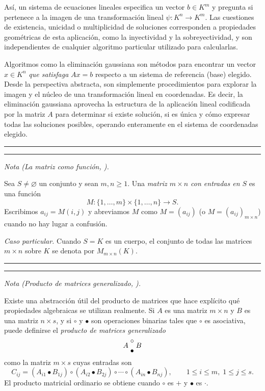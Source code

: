 Así, un sistema de ecuaciones lineales especifica un vector
\(
b \in K^m
\)
y pregunta si pertenece a la imagen de una transformación lineal
\(
\psi : K^n \to K^m.
\)
Las cuestiones de existencia, unicidad o multiplicidad de soluciones corresponden a propiedades geométricas de esta aplicación, como la inyectividad y la sobreyectividad, y son independientes de cualquier algoritmo particular utilizado para calcularlas.

\medskip

Algoritmos como la eliminación gaussiana son métodos para encontrar un vector
\(
x \in K^n
\)
\textit{que satisfaga}
\(
A x = b
\)
respecto a un sistema de referencia (base) elegido. Desde la perspectiva abstracta, son simplemente procedimientos para explorar la imagen y el núcleo de una transformación lineal en coordenadas. Es decir, la eliminación gaussiana aprovecha la estructura de la aplicación lineal codificada por la matriz \(A\) para determinar si existe solución, si es única y cómo expresar todas las soluciones posibles, operando enteramente en el sistema de coordenadas elegido.

\medskip
\hrule
\bigskip

\bigskip
\hrule
\medskip

\textit{Nota (La matriz como función, \cite{iribarren}).}

\medskip

Sea $S\neq\varnothing$ un conjunto y sean $m,n\ge 1$.
Una \emph{matriz $m\times n$ con entradas en $S$} es una función
\[
M:\{1,\dots,m\}\times\{1,\dots,n\}\longrightarrow S.
\]
Escribimos $a_{ij}=M(i,j)$ y abreviamos $M$ como $M=(a_{ij})$ (o $M=(a_{ij})_{m\times n}$) cuando no hay lugar a confusión.

\medskip

\textit{Caso particular.}
Cuando $S=K$ es un cuerpo, el conjunto de todas las matrices $m\times n$ sobre $K$ se denota por $M_{m\times n}(K)$.

\medskip
\hrule
\bigskip

\bigskip
\hrule
\medskip

\textit{Nota (Producto de matrices generalizado, \cite{knuth3}).}

Existe una abstracción útil del producto de matrices que hace explícito qué propiedades algebraicas se utilizan realmente. Si $A$ es una matriz $m\times n$ y $B$ es una matriz $n\times s$, y si $\circ$ y $\bullet$ son operaciones binarias tales que $\circ$ es asociativa, puede definirse el \emph{producto de matrices generalizado}
\[
A\,\genfrac{}{}{0pt}{}{\circ}{\bullet}\,B
\]
como la matriz $m\times s$ cuyas entradas son
\[
C_{ij} = (A_{i1}\bullet B_{1j}) \circ (A_{i2}\bullet B_{2j}) \circ \cdots \circ (A_{in}\bullet B_{nj}),
\qquad 1\le i\le m,\; 1\le j\le s.
\]
El producto matricial ordinario se obtiene cuando $\circ$ es $+$ y $\bullet$ es $\cdot$.

